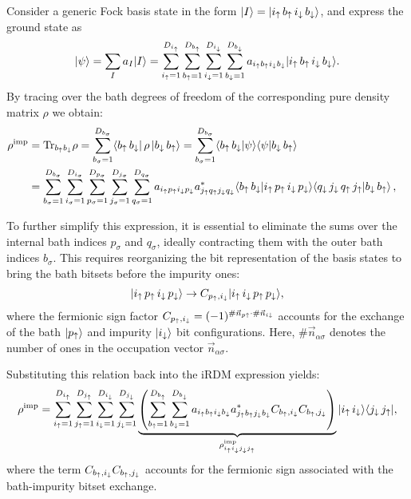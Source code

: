 \documentclass[edipack_sp.tex]{subfiles}
\begin{document}
Consider a generic Fock basis state in the form 
$|I\rangle =|{i}_\uparrow\,{b}_\uparrow\,{i}_\downarrow\,{b}_\downarrow\rangle$, and express the 
ground state as 
$$
|\psi\rangle = \sum_I a_I |I\rangle = 
    \sum_{i_\uparrow=1}^{D_{i_\uparrow}}
    \sum_{b_\uparrow=1}^{D_{b_\uparrow}}
    \sum_{i_\downarrow=1}^{D_{i_\downarrow}}
    \sum_{b_\downarrow=1}^{D_{b_\downarrow}}
    a_{i_\uparrow b_\uparrow i_\downarrow b_\downarrow}
    |{i}_\uparrow\,{b}_\uparrow\,{i}_\downarrow\,{b}_\downarrow\rangle.
$$ 
By tracing over the bath degrees of freedom of the corresponding pure density matrix $\rho$ we obtain:
\begin{equation}
  \begin{aligned}
    \rho^\mathrm{imp} &= \Tr_{b_\up b_\dw}{\rho} =
    \sum_{b_\sigma=1}^{D_{b_\sigma}}
    \bra{b_\up\, b_\dw}
    \,\rho\,
    \ket{b_\dw\, b_\up} =
    \sum_{b_\sigma=1}^{D_{b_\sigma}}
    \ibra{b_\up\, b_\dw}
    \ket{\psi}\ibra{\psi}
    \ket{b_\dw\, b_\up}    \cr
    &=
    \sum_{b_\sigma=1}^{D_{b_\sigma}}
    \sum_{i_\sigma=1}^{D_{i_\sigma}}
    \sum_{p_\sigma=1}^{D_{p_\sigma}}
    \sum_{j_\sigma=1}^{D_{j_\sigma}} 
    \sum_{q_\sigma=1}^{D_{q_\sigma}}
    a_{i_\up p_\up i_\dw p_\dw} a^*_{j_\up q_\up j_\dw q_\dw}%
    \langle{b_\up\, b_\dw}|{i_\up\, p_\up\, i_\dw\, p_\dw}\rangle
    \langle{q_\dw \,  j_\dw \, q_\up\, j_\up }|{b_\dw\, b_\up}\rangle\, ,
  \end{aligned}
\end{equation}

To further simplify this expression, it is essential to eliminate the 
sums over the internal bath indices $p_\sigma$ and $q_\sigma$, ideally 
contracting them with the outer bath indices $b_\sigma$. This requires 
reorganizing the bit representation of the basis states to bring the 
bath bitsets before the impurity ones:
$$
|i_\uparrow\, p_\uparrow\, i_\downarrow\, p_\downarrow\rangle \rightarrow C_{p_\uparrow,i_\downarrow} |i_\uparrow\, i_\downarrow \,p_\uparrow\,p_\downarrow\rangle,
$$
where the fermionic sign factor
$C_{p_\uparrow,i_\downarrow}  = (-1)^{\#\vec{n}_{p\uparrow} \cdot
  \#\vec{n}_{i\downarrow}}$
accounts for the exchange of the bath $|p_\uparrow\rangle$  and impurity
$|i_\downarrow\rangle$ bit configurations.
Here, $\#\vec{n}_{\alpha\sigma}$ denotes the number of ones in the 
occupation vector $\vec{n}_{\alpha\sigma}$. 

Substituting this relation back into the iRDM expression yields:
\begin{equation}
    \rho^\mathrm{imp} =
    \sum_{i_\uparrow=1}^{D_{i_\uparrow}}
    \sum_{j_\uparrow=1}^{D_{j_\uparrow}}
    \sum_{i_\downarrow=1}^{D_{i_\downarrow}}
    \sum_{j_\downarrow=1}^{D_{j_\downarrow}}
    \underbrace{\left(
    \sum_{b_\uparrow=1}^{D_{b_\uparrow}}
    \sum_{b_\downarrow=1}^{D_{b_\downarrow}}
    a_{i_\uparrow b_\uparrow i_\downarrow b_\downarrow} a^*_{j_\uparrow b_\uparrow j_\downarrow b_\downarrow}
    C_{b_\uparrow,i_\downarrow}C_{b_\uparrow,j_\downarrow}\right)}_{
    \rho^\mathrm{imp}_{i_\uparrow i_\downarrow j_\downarrow j_\uparrow}}
    |i_\uparrow\, i_\downarrow\rangle\langle j_\downarrow \, j_\uparrow|,
  \end{equation}
where the term 
$C_{b_\uparrow,i_\downarrow}C_{b_\uparrow,j_\downarrow}$ accounts for the fermionic 
sign associated with the bath-impurity bitset exchange.
\end{document}
